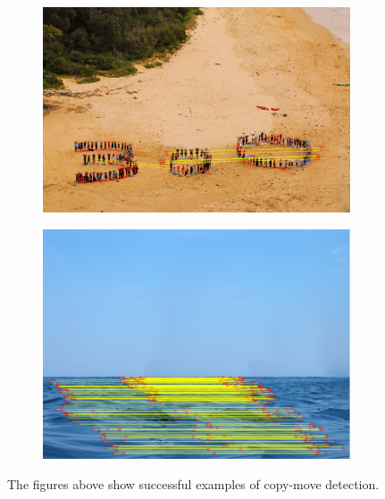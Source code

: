 \documentclass[12pt]{article}
\begin{document}
\begin{figure}
\begin{subfigure}{.5\textwidth}
  \centering
  \includegraphics[width=.8\linewidth]{./gfx/three_hundred.png}
\end{subfigure}
\begin{subfigure}{.493\textwidth}
  \centering
  \includegraphics[width=.8\linewidth]{./gfx/water.png}
\end{subfigure}


\caption{The figures above show successful examples of copy-move detection.}
\label{fig:test}
\end{figure}
\end{document}
